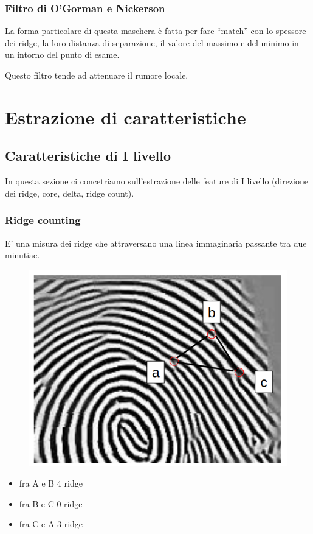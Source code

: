 \documentclass{report}
\begin{document}
\newpage
\subsection{Filtro di O'Gorman e Nickerson}

La forma particolare di questa maschera è fatta per fare
“match” con lo spessore dei ridge, la loro distanza di
separazione, il valore del massimo e del minimo in un
intorno del punto di esame.

\noindent Questo filtro tende ad attenuare il rumore locale.


\chapter{Estrazione di caratteristiche}

\section{Caratteristiche di I livello}
In questa sezione ci concetriamo sull'estrazione delle feature di I livello (direzione dei ridge, core, delta, ridge count).

\subsection{Ridge counting}

E’ una misura dei ridge che attraversano una
linea immaginaria passante tra due minutiae.

\begin{figure}[ht]
    \centering
    \includegraphics[width=0.5\linewidth]{images/ridge-counting.png}
\end{figure}

\begin{itemize}
    \item fra A e B 4 ridge
    \item fra B e C 0 ridge
    \item fra C e A 3 ridge
\end{itemize}
\end{document}
